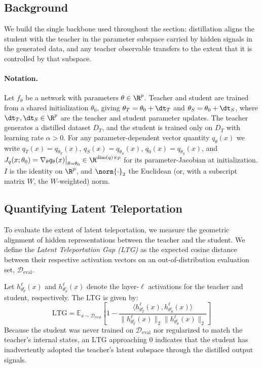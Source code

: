 
\subsection{Background}
\label{sec:background}

We build the single backbone used throughout the section: distillation aligns the student with the teacher in the parameter subspace carried by hidden signals in the generated data, and any teacher observable transfers to the extent that it is controlled by that subspace.

\paragraph{Notation.}
Let $f_\theta$ be a network with parameters $\theta\in\R^{p}$. Teacher and student are trained from a shared initialization $\theta_0$, giving $\theta_T=\theta_0+\dt_T$ and $\theta_S=\theta_0+\dt_S$, where $\dt_T,\dt_S\in\R^{p}$ are the teacher and student parameter updates. The teacher generates a distilled dataset $D_T$, and the student is trained only on $D_T$ with learning rate $\alpha>0$. For any parameter-dependent vector quantity $q_\theta(x)$ we write $q_T(x)=q_{\theta_T}(x)$, $q_S(x)=q_{\theta_S}(x)$, $q_0(x)=q_{\theta_0}(x)$, and $J_q(x;\theta_0)=\nabla_\theta q_\theta(x)\big|_{\theta=\theta_0}\in\R^{\dim(q)\times p}$ for its parameter-Jacobian at initialization. $I$ is the identity on $\R^{p}$, and $\norm{\cdot}_2$ the Euclidean (or, with a subscript matrix $W$, the $W$-weighted) norm.

\subsection{Quantifying Latent Teleportation}
\label{sec:quantifying_teleportation}

To evaluate the extent of latent teleportation, we measure the geometric alignment of hidden representations between the teacher and the student. We define the \emph{Latent Teleportation Gap (LTG)} as the expected cosine distance between their respective activation vectors on an out-of-distribution evaluation set, $\mathcal{D}_{\mathrm{eval}}$. 

Let $h_{\theta_T^\epsilon}^\ell(x)$ and $h_{\theta_S^\epsilon}^\ell(x)$ denote the layer-$\ell$ activations for the teacher and student, respectively. The LTG is given by:
\[
\mathrm{LTG} = \mathbb{E}_{x \sim \mathcal{D}_{\mathrm{eval}}} \left[ 1 - \frac{\langle h_{\theta_T^\epsilon}^\ell(x), h_{\theta_S^\epsilon}^\ell(x) \rangle}{\| h_{\theta_T^\epsilon}^\ell(x) \|_2 \| h_{\theta_S^\epsilon}^\ell(x) \|_2} \right]
\]
Because the student was never trained on $\mathcal{D}_{\mathrm{eval}}$ nor regularized to match the teacher's internal states, an $\mathrm{LTG}$ approaching $0$ indicates that the student has inadvertently adopted the teacher's latent subspace through the distilled output signals.


